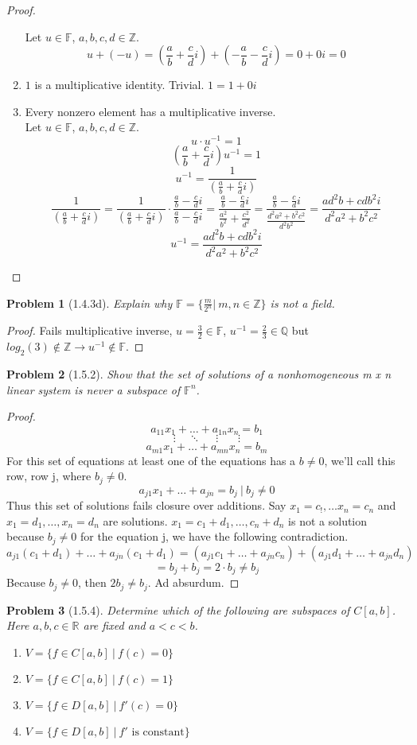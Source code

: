 \documentclass[12pt]{article}   %
\newcommand{\Z}{\mathbb{Z}} %
\newcommand{\R}{\mathbb{R}} %
\newcommand{\Q}{\mathbb{Q}} %
\newcommand{\F}{\mathbb{F}} %
\newcommand{\vu}{u}
\newtheorem{problem}{Problem}
\begin{document}
\begin{proof}
\begin{enumerate}
    Let $u\in\F$, $a,b,c,d\in\Z$.
    \[\vu + (-\vu) = (\frac{a}{b}+\frac{c}{d}i)+(-\frac{a}{b}-\frac{c}{d}i)=0+0i= 0\]
    \item $1$ is a multiplicative identity. Trivial. $ 1=1+0i$
    \item Every nonzero element has a multiplicative inverse.\\
    Let $\vu \in \F$, $a,b,c,d\in\Z$.
    \[\vu\cdot\vu^{-1} = 1\]
    \[(\frac{a}{b}+\frac{c}{d}i)\vu^{-1}=1\]
    \[\vu^{-1}=\frac{1}{(\frac{a}{b}+\frac{c}{d}i)}\]
    \[\frac{1}{(\frac{a}{b}+\frac{c}{d}i)}=\frac{1}{(\frac{a}{b}+\frac{c}{d}i)}\cdot\frac{\frac{a}{b}-\frac{c}{d}i}{\frac{a}{b}-\frac{c}{d}i}=\frac{\frac{a}{b}-\frac{c}{d}i}{\frac{a^2}{b^2}+\frac{c^2}{d^2}}=\frac{\frac{a}{b}-\frac{c}{d}i}{\frac{d^2a^2+b^2c^2}{d^2b^2}}=\frac{ad^2b+cdb^2i}{d^2a^2+b^2c^2}\]
    \[\vu^{-1}=\frac{ad^2b+cdb^2i}{d^2a^2+b^2c^2}\]
\end{enumerate}
\end{proof}
\begin{problem}[1.4.3d]
Explain why $\F=\{\frac{m}{2^n}|\ m,n\in\Z\}$ is not a field. 
\end{problem}
\begin{proof}
Fails multiplicative inverse, $\vu=\frac{3}{2}\in \F$, $\vu^{-1}=\frac{2}{3}\in\Q$ but $log_2(3)\not\in \Z\rightarrow \vu^{-1}\not\in\F$.
\end{proof}
\begin{problem}[1.5.2]
Show that the set of solutions of a nonhomogeneous m x n linear system is never a subspace of $\F^n$.
\end{problem}
\begin{proof}
\[a_{11}x_1+\dots+a_{1n}x_n=b_1\]
\[\vdots\ \ \ \ \ \ddots\ \ \ \ \ \ \vdots\ \ \ \ \ \ \ \ \vdots\]
\[a_{m1}x_1+\dots+a_{mn}x_n=b_m\]
For this set of equations at least one of the equations has a $b\neq 0$, we'll call this row, row j, where $b_j \neq 0$.
\[a_{j1}x_1+\dots + a_{jn}= b_j\ |\ b_j \neq 0\]
Thus this set of solutions fails closure over additions. Say $x_1=c_!,\dots x_n=c_n$ and $x_1=d_1,\dots,x_n=d_n$ are solutions. $x_1=c_1+d_1,\dots,c_n+d_n$ is not a solution because $b_j\neq 0$ for the equation j, we have the following contradiction.
\[a_{j1}(c_1+d_1)+\dots+a_{jn}(c_1+d_1)=(a_{j1}c_1+\dots+a_{jn}c_n)+(a_{j1}d_1+\dots+a_{jn}d_n)\]
\[=b_j+b_j=2\cdot b_j\neq b_j\]
Because $b_j\neq 0$, then $2b_j\neq b_j$. Ad absurdum.
\end{proof}
\begin{problem}[1.5.4]
Determine which of the following are subspaces of $C[a,b]$. Here $a,b,c\in\R$ are fixed and $a<c<b$.
\begin{enumerate}[label=(\alph*)]
    \item $V=\{f\in C[a,b]\ |\ f(c)=0\}$
    \item $V=\{f\in C[a,b]\ |\ f(c)=1\}$
    \item $V=\{f\in D[a,b]\ |\ f'(c)=0\}$
    \item $V=\{f\in D[a,b]\ |\ f' \text{ is constant}\}$
\end{enumerate}
\end{problem}
\end{document}
